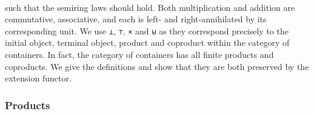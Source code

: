 {\begin{code}
\>[0]\AgdaSpace{}%
\AgdaSymbol{:}\AgdaSpace{}%
\AgdaSpace{}%
\AgdaSpace{}%
\AgdaSpace{}%
\AgdaSpace{}%
\<%
\\
\>[0]\AgdaSymbol{(}\AgdaSpace{}%
\AgdaSpace{}%
\AgdaSymbol{)}\AgdaSpace{}%
\AgdaSpace{}%
\AgdaSymbol{(}\AgdaSpace{}%
\AgdaSpace{}%
\AgdaSymbol{)}\AgdaSpace{}%
\AgdaSymbol{=}\AgdaSpace{}%
\AgdaSymbol{(}\AgdaSpace{}%
\AgdaSpace{}%
\AgdaSymbol{)}\AgdaSpace{}%
\AgdaSpace{}%
\AgdaSpace{}%
\AgdaSymbol{(}\AgdaSpace{}%
\AgdaSymbol{)}\AgdaSpace{}%
\AgdaSpace{}%
\AgdaSpace{}%
\AgdaSpace{}%
\AgdaSymbol{;}\AgdaSpace{}%
\AgdaSymbol{(}\AgdaSpace{}%
\AgdaSymbol{)}\AgdaSpace{}%
\AgdaSpace{}%
\AgdaSpace{}%
\AgdaSpace{}%
\AgdaSymbol{\}}\<%
\end{code}

such that the semiring laws should hold. Both multiplication and addition are commutative, associative, and each is left- and right-annihilated by its corresponding unit. We use \texttt{⊥}, \texttt{⊤}, \texttt{×} and \texttt{⊎} as they correspond precisely to the initial object, terminal object, product and coproduct within the category of containers. In fact, the category of containers has all finite products and coproducts. We give the definitions and show that they are both preserved by the extension functor.

\subsubsection*{Products}

}
